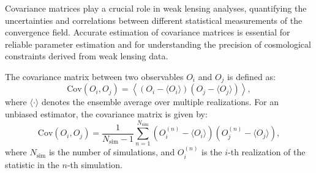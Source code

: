 Covariance matrices play a crucial role in weak lensing analyses, quantifying the uncertainties and correlations between different statistical measurements of the convergence field. Accurate estimation of covariance matrices is essential for reliable parameter estimation and for understanding the precision of cosmological constraints derived from weak lensing data.

The covariance matrix between two observables $O_i$ and $O_j$ is defined as:
\begin{equation}
    \mathrm{Cov}(O_i, O_j) = \left\langle (O_i - \langle O_i \rangle)(O_j - \langle O_j \rangle) \right\rangle,
\end{equation}
where $\langle \cdot \rangle$ denotes the ensemble average over multiple realizations.
For an unbiased estimator, the covariance matrix is given by:
\begin{equation}
    \label{eq:covariance}
    \mathrm{Cov}(O_i, O_j) = \frac{1}{N_{\mathrm{sim}} - 1} \sum_{n=1}^{N_{\mathrm{sim}}} (O_i^{(n)} - \langle O_i \rangle) (O_j^{(n)} - \langle O_j \rangle),
\end{equation}
where \( N_{\mathrm{sim}} \) is the number of simulations, and \( O_i^{(n)} \) is the \( i \)-th realization of the statistic in the \( n \)-th simulation.

